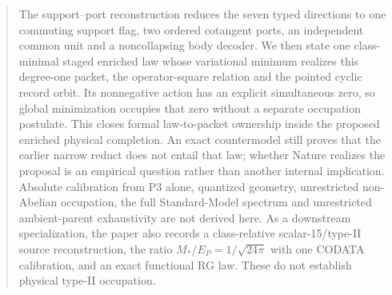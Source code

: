 \documentclass[11pt]{article}
\begin{document}
\begin{abstract}
The support--port reconstruction reduces the seven typed directions to one
commuting support flag, two ordered cotangent ports, an independent common
unit and a noncollapsing body decoder.  We then state one class-minimal staged
enriched law whose variational minimum realizes this degree-one packet, the
operator-square relation and the pointed cyclic record orbit.  Its
nonnegative action has an explicit simultaneous zero, so global minimization
occupies that zero without a separate occupation postulate.  This closes
formal law-to-packet ownership inside the proposed enriched physical
completion.  An exact countermodel still proves that the earlier narrow
reduct does not entail that law; whether Nature realizes the proposal is an
empirical question rather than another internal implication.  Absolute
calibration from P3 alone, quantized geometry, unrestricted non-Abelian
occupation, the full Standard-Model spectrum and unrestricted ambient-parent
exhaustivity are not derived here.  As a downstream specialization, the paper
also records a class-relative scalar-15/type-II source reconstruction, the
ratio \(M_*/E_P=1/\sqrt{24\pi}\) with one CODATA calibration, and an exact
functional RG law.  These do not establish physical type-II occupation.
\end{abstract}
\end{document}
